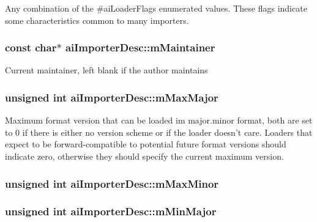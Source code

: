 Any combination of the \#ai\-Loader\-Flags enumerated values. These flags indicate some characteristics common to many importers. \hypertarget{structai_importer_desc_a53bf0ecb36ce0b97018b4b6bd2748f02}{
\subsubsection[{m\-Maintainer}]{\setlength{\rightskip}{0pt plus 5cm}const char$\ast$ ai\-Importer\-Desc\-::m\-Maintainer}}\label{structai_importer_desc_a53bf0ecb36ce0b97018b4b6bd2748f02}
Current maintainer, left blank if the author maintains \hypertarget{structai_importer_desc_a9d33eac3be20f7f4630f838a228ada63}{
\subsubsection[{m\-Max\-Major}]{\setlength{\rightskip}{0pt plus 5cm}unsigned {\bf int} ai\-Importer\-Desc\-::m\-Max\-Major}}\label{structai_importer_desc_a9d33eac3be20f7f4630f838a228ada63}
Maximum format version that can be loaded im major.\-minor format, both are set to 0 if there is either no version scheme or if the loader doesn't care. Loaders that expect to be forward-\/compatible to potential future format versions should indicate zero, otherwise they should specify the current maximum version. \hypertarget{structai_importer_desc_ae4c60eec7020af836b23537148f47f83}{
\subsubsection[{m\-Max\-Minor}]{\setlength{\rightskip}{0pt plus 5cm}unsigned {\bf int} ai\-Importer\-Desc\-::m\-Max\-Minor}}\label{structai_importer_desc_ae4c60eec7020af836b23537148f47f83}
\hypertarget{structai_importer_desc_aee34d348f522807f0a36607664e92a57}{
\subsubsection[{m\-Min\-Major}]{\setlength{\rightskip}{0pt plus 5cm}unsigned {\bf int} ai\-Importer\-Desc\-::m\-Min\-Major}}\label{structai_importer_desc_aee34d348f522807f0a36607664e92a57}
